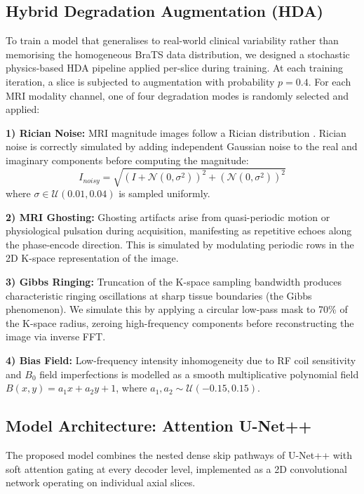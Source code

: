 \documentclass[conference]{IEEEtran}
\begin{document}
\subsection{Hybrid Degradation Augmentation (HDA)}
\label{subsec:hda}

To train a model that generalises to real-world clinical variability rather than memorising the homogeneous BraTS data distribution, we designed a stochastic physics-based HDA pipeline applied per-slice during training. At each training iteration, a slice is subjected to augmentation with probability $p=0.4$. For each MRI modality channel, one of four degradation modes is randomly selected and applied:

\textbf{1) Rician Noise:} MRI magnitude images follow a Rician distribution \cite{perez2021torchio}. Rician noise is correctly simulated by adding independent Gaussian noise to the real and imaginary components before computing the magnitude:
\begin{equation}
    I_{noisy} = \sqrt{(I + \mathcal{N}(0,\sigma^2))^2 + (\mathcal{N}(0,\sigma^2))^2}
\end{equation}
where $\sigma \in \mathcal{U}(0.01, 0.04)$ is sampled uniformly.

\textbf{2) MRI Ghosting:} Ghosting artifacts arise from quasi-periodic motion or physiological pulsation during acquisition, manifesting as repetitive echoes along the phase-encode direction. This is simulated by modulating periodic rows in the 2D K-space representation of the image.

\textbf{3) Gibbs Ringing:} Truncation of the K-space sampling bandwidth produces characteristic ringing oscillations at sharp tissue boundaries (the Gibbs phenomenon). We simulate this by applying a circular low-pass mask to 70\% of the K-space radius, zeroing high-frequency components before reconstructing the image via inverse FFT.

\textbf{4) Bias Field:} Low-frequency intensity inhomogeneity due to RF coil sensitivity and $B_0$ field imperfections is modelled as a smooth multiplicative polynomial field $B(x,y) = a_1 x + a_2 y + 1$, where $a_1, a_2 \sim \mathcal{U}(-0.15, 0.15)$.

\subsection{Model Architecture: Attention U-Net++}
\label{subsec:arch}

The proposed model combines the nested dense skip pathways of U-Net++ with soft attention gating at every decoder level, implemented as a 2D convolutional network operating on individual axial slices.
\end{document}
